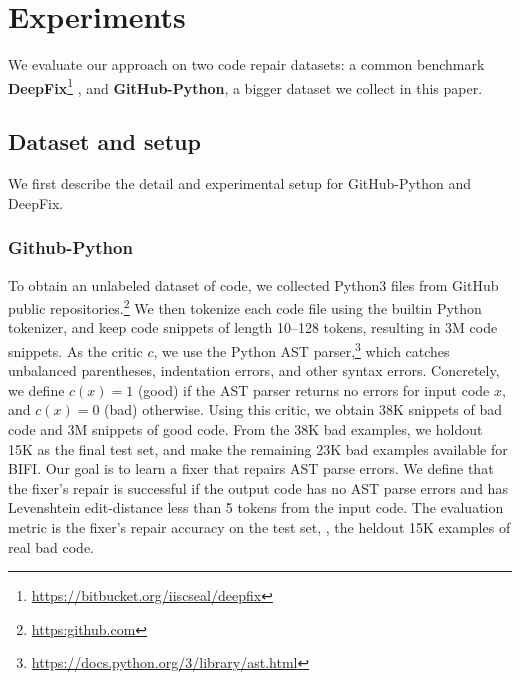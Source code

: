 \section{Experiments}
\label{sec:experiments}

We evaluate our approach on two code repair datasets: a common benchmark \textbf{DeepFix}\footnote{{\url{https://bitbucket.org/iiscseal/deepfix}}} \citep{gupta2017deepfix}, and \textbf{GitHub-Python}, a bigger dataset we collect in this paper.


\subsection{Dataset and setup}
\label{sec:exp-setup}

We first describe the detail and experimental setup for GitHub-Python and DeepFix.

\subsubsection{Github-Python}
To obtain an unlabeled dataset of code, we collected Python3 files from GitHub public repositories.\footnote{\url{https:github.com}\vspace{0mm}}
We then tokenize each code file using the builtin Python tokenizer, and keep code snippets of length 10--128 tokens, resulting in 3M code snippets.
As the critic $c$, we use the Python AST parser,\footnote{\url{https://docs.python.org/3/library/ast.html}} 
which catches unbalanced parentheses, indentation errors, and other syntax errors. Concretely, we define $c(x) = 1$ (good) if the AST parser returns no errors for input code $x$, and $c(x) = 0$ (bad) otherwise.
Using this critic, we obtain 38K snippets of bad code and 3M snippets of good code.
From the 38K bad examples, we holdout 15K as the final test set, and make the remaining 23K bad examples available for BIFI.
Our goal is to learn a fixer that repairs AST parse errors. We define that the fixer's repair is successful if the output code has no AST parse errors and has Levenshtein edit-distance \cite{levenshtein1966binary} less than 5 tokens from the input code.
The evaluation metric is the fixer's repair accuracy on the test set, \ie, the heldout 15K examples of real bad code.

